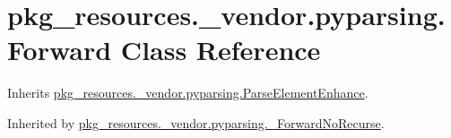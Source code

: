 \hypertarget{classpkg__resources_1_1__vendor_1_1pyparsing_1_1_forward}{}\section{pkg\+\_\+resources.\+\_\+vendor.\+pyparsing.\+Forward Class Reference}
\label{classpkg__resources_1_1__vendor_1_1pyparsing_1_1_forward}


Inherits \hyperlink{classpkg__resources_1_1__vendor_1_1pyparsing_1_1_parse_element_enhance}{pkg\+\_\+resources.\+\_\+vendor.\+pyparsing.\+Parse\+Element\+Enhance}.



Inherited by \hyperlink{classpkg__resources_1_1__vendor_1_1pyparsing_1_1___forward_no_recurse}{pkg\+\_\+resources.\+\_\+vendor.\+pyparsing.\+\_\+\+Forward\+No\+Recurse}.

